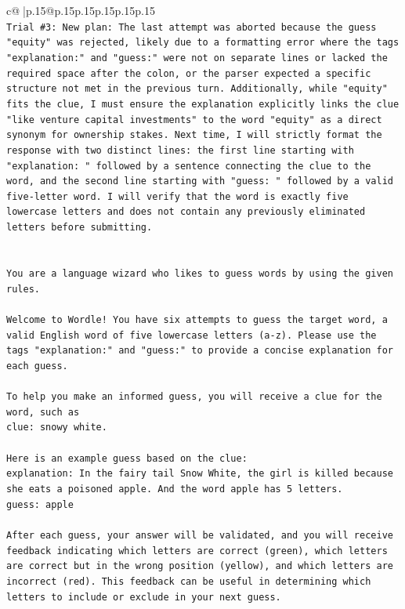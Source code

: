 \documentclass{article}
\begin{document}
{\begin{supertabular}{c@{$\;$}|p{.15\linewidth}@{}p{.15\linewidth}p{.15\linewidth}p{.15\linewidth}p{.15\linewidth}p{.15\linewidth}}
{{{\\ 
\texttt{Trial \#3: New plan: The last attempt was aborted because the guess "equity" was rejected, likely due to a formatting error where the tags "explanation:" and "guess:" were not on separate lines or lacked the required space after the colon, or the parser expected a specific structure not met in the previous turn. Additionally, while "equity" fits the clue, I must ensure the explanation explicitly links the clue "like venture capital investments" to the word "equity" as a direct synonym for ownership stakes. Next time, I will strictly format the response with two distinct lines: the first line starting with "explanation: " followed by a sentence connecting the clue to the word, and the second line starting with "guess: " followed by a valid five{-}letter word. I will verify that the word is exactly five lowercase letters and does not contain any previously eliminated letters before submitting.} \\
\\ 
\\ 
\texttt{You are a language wizard who likes to guess words by using the given rules.} \\
\\ 
\texttt{Welcome to Wordle! You have six attempts to guess the target word, a valid English word of five lowercase letters (a{-}z). Please use the tags "explanation:" and "guess:" to provide a concise explanation for each guess.} \\
\\ 
\texttt{To help you make an informed guess, you will receive a clue for the word, such as} \\
\texttt{clue: snowy white.} \\
\\ 
\texttt{Here is an example guess based on the clue:} \\
\texttt{explanation: In the fairy tail Snow White, the girl is killed because she eats a poisoned apple. And the word apple has 5 letters.} \\
\texttt{guess: apple} \\
\\ 
\texttt{After each guess, your answer will be validated, and you will receive feedback indicating which letters are correct (green), which letters are correct but in the wrong position (yellow), and which letters are incorrect (red). This feedback can be useful in determining which letters to include or exclude in your next guess.} \\
\\ 
}}}
\end{supertabular}}
\end{document}
